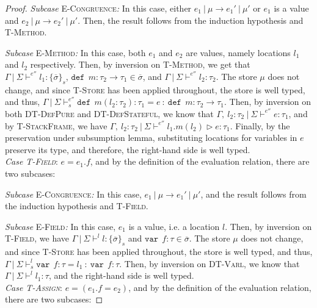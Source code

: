 \documentclass{llncs}
\newcommand{\keywadj}[1]{\mathtt{#1}}
\newcommand{\keyw}[1]{\keywadj{#1}~}
\begin{document}
\begin{proof}
\textit{Subcase} \textsc{E-Congruence}\textit{:} In this case, either $e_1~|~\mu \longrightarrow e_1'~|~\mu'$ or $e_1$ is a value and $e_2~|~\mu \longrightarrow e_2'~|~\mu'$. Then, the result follows from the induction hypothesis and \textsc{T-Method}.

\textit{Subcase} \textsc{E-Method}\textit{:} In this case, both $e_1$ and $e_2$ are values, namely locations $l_1$ and $l_2$ respectively. Then, by inversion on \textsc{T-Method}, we get that $\Gamma~|~\Sigma \vdash^{e''} l_1 : \{ \overline{\sigma} \}_s$, $\keyw{def}~ m : \tau_2 \rightarrow \tau_1 \in \overline{\sigma}$, and $\Gamma~|~\Sigma \vdash^{e''} l_2 : \tau_2$. The store $\mu$ does not change, and since \textsc{T-Store} has been applied throughout, the store is well typed, and thus, \mbox{$\Gamma~|~\Sigma \vdash^{e''}_s \keyw{def}~ m(l_2 : \tau_2) : \tau_1 = e~:~\keyw{def}~ m : \tau_2 \rightarrow \tau_1$}. Then, by inversion on both \textsc{DT-DefPure} and \textsc{DT-DefStateful}, we know that $\Gamma,~l_2 : \tau_2~|~\Sigma \vdash^{e''} e : \tau_1$, and by \textsc{T-StackFrame}, we have $\Gamma,~l_2 : \tau_2~|~\Sigma \vdash^{e''} l_1.m(l_2) \rhd e : \tau_1$. Finally, by the preservation under subsumption lemma, substituting locations for variables in $e$ preserve its type, and therefore, the right-hand side is well typed.
\\

\noindent\textit{Case \textsc{T-Field}}:
$e = e_1.f$, and by the definition of the evaluation relation, there are two subcases:

\textit{Subcase} \textsc{E-Congruence}\textit{:} In this case, $e_1~|~\mu \longrightarrow e_1'~|~\mu'$, and the result follows from the induction hypothesis and \textsc{T-Field}.

\textit{Subcase} \textsc{E-Field}\textit{:} In this case, $e_1$ is a value, i.e. a location $l$. Then, by inversion on  \textsc{T-Field}, we have $\Gamma~|~\Sigma \vdash^l l : \{ \overline{\sigma} \}_s$ and $\keyw{var}~ f : \tau \in \overline{\sigma}$. The store $\mu$ does not change, and since \textsc{T-Store} has been applied throughout, the store is well typed, and thus, \mbox{$\Gamma~|~\Sigma \vdash^l_s \keyw{var}~ f : \tau = l_1~:~\keyw{var}~ f : \tau$}. Then, by inversion on \textsc{DT-Varl}, we know that $\Gamma~|~\Sigma \vdash^l l_1 : \tau$, and the right-hand side is well typed.
\\

\noindent\textit{Case \textsc{T-Assign}}:
$e = (e_1.f = e_2)$, and by the definition of the evaluation relation, there are two subcases:


\end{proof}
\end{document}
